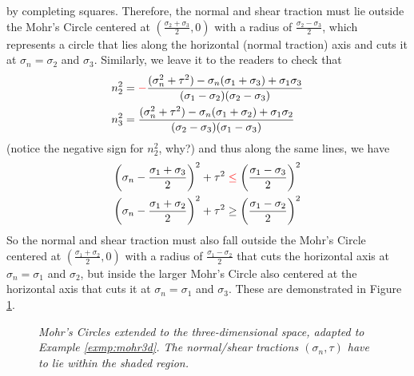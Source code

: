 by completing squares. Therefore, the normal and shear traction must lie outside the Mohr's Circle centered at $(\frac{\sigma_2 + \sigma_3}{2},0)$ with a radius of $\frac{\sigma_2 - \sigma_3}{2}$, which represents a circle that lies along the horizontal (normal traction) axis and cuts it at $\sigma_n = \sigma_2$ and $\sigma_3$. Similarly, we leave it to the readers to check that
\begin{align}
n_2^2 &= \mathcolor{red}{-}\frac{(\sigma_n^2 + \tau^2) - \sigma_n(\sigma_1 + \sigma_3) + \sigma_1\sigma_3}{(\sigma_1 - \sigma_2)(\sigma_2-\sigma_3)} \\
n_3^2 &= \frac{(\sigma_n^2 + \tau^2) - \sigma_n(\sigma_1 + \sigma_2) + \sigma_1\sigma_2}{(\sigma_2 - \sigma_3)(\sigma_1-\sigma_3)}
\end{align}
(notice the negative sign for $n_2^2$, why?) and thus along the same lines, we have
\begin{align}
\left(\sigma_n-\frac{\sigma_1 + \sigma_3}{2}\right)^2 + \tau^2 &\mathcolor{red}{\leq} \left(\frac{\sigma_1 - \sigma_3}{2}\right)^2 \\
\left(\sigma_n-\frac{\sigma_1 + \sigma_2}{2}\right)^2 + \tau^2 &\geq \left(\frac{\sigma_1 - \sigma_2}{2}\right)^2
\end{align}
So the normal and shear traction must also fall outside the Mohr's Circle centered at $(\frac{\sigma_1 + \sigma_2}{2},0)$ with a radius of $\frac{\sigma_1 - \sigma_2}{2}$ that cuts the horizontal axis at $\sigma_n = \sigma_1$ and $\sigma_2$, but inside the larger Mohr's Circle also centered at the horizontal axis that cuts it at $\sigma_n = \sigma_1$ and $\sigma_3$. These are demonstrated in Figure \ref{fig:mohr3d}.

\begin{figure}
    \centering
    \caption{\textit{Mohr's Circles extended to the three-dimensional space, adapted to Example \ref{exmp:mohr3d}. The normal/shear tractions $(\sigma_n, \tau)$ have to lie within the shaded region.}}
    \label{fig:mohr3d}
\end{figure}

